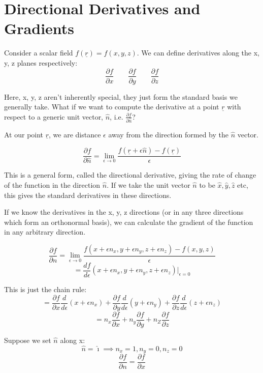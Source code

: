 
\section{Directional Derivatives and Gradients}
Consider a scalar field $f(\underline{r}) = f(x, y, z)$. We can define derivatives along the x, y, z planes respectively:
\[
    \frac{\partial f}{\partial x} \qquad \frac{\partial f}{\partial y} \qquad \frac{\partial f}{\partial z}
\]

Here, x, y, z aren't inherently special, they just form the standard basis we generally take. What if we want to compute the derivative at a point $\underline{r}$ with respect to a generic unit vector, $\hat{n}$, i.e. $\frac{\partial f}{\partial \hat{n}}$?

At our point $\underline{r}$, we are distance $\epsilon$ away from the direction formed by the $\hat{n}$ vector.

\[
    \frac{\partial f}{\partial \hat{n}} = \lim_{\epsilon \to 0} \frac{f(\underline{r} + \epsilon \hat{n}) - f(\underline{r})}{\epsilon}
\]

This is a general form, called the directional derivative, giving the rate of change of the function in the direction $\hat{n}$. If we take the unit vector $\hat{n}$ to be $\hat{x}, \hat{y}, \hat{z}$ etc, this gives the standard derivatives in these directions.

If we know the derivatives in the x, y, z directions (or in any three directions which form an orthonormal basis), we can calculate the gradient of the function in any arbitrary direction.

\[
    \frac{\partial f}{\partial n} = \lim_{\epsilon \to 0} \frac{f(x + \epsilon n_x, y + \epsilon n_y, z + \epsilon n_z) - f(x, y, z)}{\epsilon}
\]
\[
    = \frac{df}{d \epsilon} (x + \epsilon n_x, y + \epsilon n_y, z + \epsilon n_z ) \biggr\rvert_{\epsilon = 0}
\]

This is just the chain rule:
\[
    = \frac{\partial f}{\partial x} \frac{d}{d \epsilon} (x + \epsilon n_x) + \frac{\partial f}{\partial y} \frac{d}{d \epsilon} (y + \epsilon n_y) + \frac{\partial f}{\partial z} \frac{d}{d \epsilon} (z + \epsilon n_z)
\]
\[
    = n_x \frac{\partial f}{\partial x} + n_y \frac{\partial f}{\partial y} + n_Z \frac{\partial f}{\partial z}
\]

Suppose we set $\hat{n}$ along x:
\[
    \hat{n} = \hat{\imath} \implies n_x = 1, n_y = 0, n_z = 0
\]
\[
    \frac{\partial f}{\partial n} = \frac{\partial f}{\partial x}
\]

